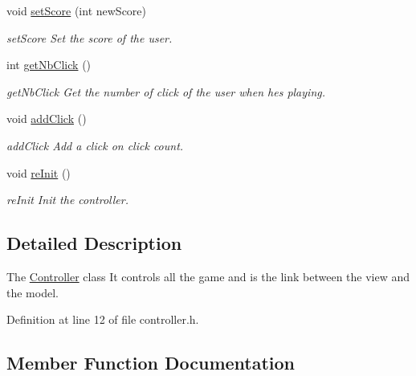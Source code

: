 \begin{DoxyCompactItemize}
void \hyperlink{class_controller_af9823d858e9ed334c8d20601f1e1fb02}{set\+Score} (int new\+Score)
\begin{DoxyCompactList}\small\item\em set\+Score Set the score of the user. \end{DoxyCompactList}\item 
int \hyperlink{class_controller_a1f5e158318b26e15a023391827617c04}{get\+Nb\+Click} ()
\begin{DoxyCompactList}\small\item\em get\+Nb\+Click Get the number of click of the user when he\textquotesingle{}s playing. \end{DoxyCompactList}\item 
\mbox{\label{class_controller_a06c2739a07f098cfb843b0b4f6a3826f}} 
void \hyperlink{class_controller_a06c2739a07f098cfb843b0b4f6a3826f}{add\+Click} ()
\begin{DoxyCompactList}\small\item\em add\+Click Add a click on click count. \end{DoxyCompactList}\item 
\mbox{\label{class_controller_a7b328695be686af4a9f7fe290781fbb0}} 
void \hyperlink{class_controller_a7b328695be686af4a9f7fe290781fbb0}{re\+Init} ()
\begin{DoxyCompactList}\small\item\em re\+Init Init the controller. \end{DoxyCompactList}\end{DoxyCompactItemize}


\subsection{Detailed Description}
The \hyperlink{class_controller}{Controller} class It controls all the game and is the link between the view and the model. 

Definition at line 12 of file controller.\+h.



\subsection{Member Function Documentation}
\mbox{\label{class_controller_a913c8ab636b486a26a4dd533d84e15b6}} 
